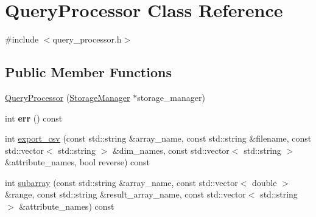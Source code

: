 \hypertarget{classQueryProcessor}{}\section{Query\+Processor Class Reference}
\label{classQueryProcessor}


{\ttfamily \#include $<$query\+\_\+processor.\+h$>$}

\subsection*{Public Member Functions}
\begin{DoxyCompactItemize}
\item 
\hyperlink{classQueryProcessor_a07816ecd785ad36631c525e3babaa6b0}{Query\+Processor} (\hyperlink{classStorageManager}{Storage\+Manager} $\ast$storage\+\_\+manager)
\item 
\hypertarget{classQueryProcessor_a266b9a19078345543700e8654949b1b0}{}int {\bfseries err} () const \label{classQueryProcessor_a266b9a19078345543700e8654949b1b0}

\item 
int \hyperlink{classQueryProcessor_ad30605917457abc19c3e5606fbb6d581}{export\+\_\+csv} (const std\+::string \&array\+\_\+name, const std\+::string \&filename, const std\+::vector$<$ std\+::string $>$ \&dim\+\_\+names, const std\+::vector$<$ std\+::string $>$ \&attribute\+\_\+names, bool reverse) const 
\item 
int \hyperlink{classQueryProcessor_add4b7d3e4e75b226016f385d09001f1e}{subarray} (const std\+::string \&array\+\_\+name, const std\+::vector$<$ double $>$ \&range, const std\+::string \&result\+\_\+array\+\_\+name, const std\+::vector$<$ std\+::string $>$ \&attribute\+\_\+names) const 
\end{DoxyCompactItemize}
